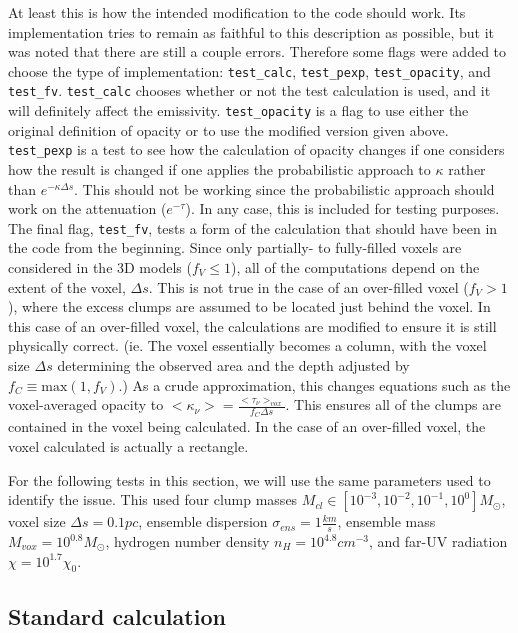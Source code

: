 \documentclass[a4paper]{article}
\begin{document}
    At least this is how the intended modification to the code should work.
    Its implementation tries to remain as faithful to this description as possible, but it was noted that there are still a couple errors.
    Therefore some flags were added to choose the type of implementation: \texttt{test\_calc}, \texttt{test\_pexp}, \texttt{test\_opacity}, and \texttt{test\_fv}.
    \texttt{test\_calc} chooses whether or not the test calculation is used, and it will definitely affect the emissivity.
    \texttt{test\_opacity} is a flag to use either the original definition of opacity or to use the modified version given above.
    \texttt{test\_pexp} is a test to see how the calculation of opacity changes if one considers how the result is changed if one applies the probabilistic approach to \(\kappa\) rather than \(e^{-\kappa \Delta s}\).
    This should not be working since the probabilistic approach should work on the attenuation (\(e^{-\tau}\)).
    In any case, this is included for testing purposes.
    The final flag, \texttt{test\_fv}, tests a form of the calculation that should have been in the code from the beginning.
    Since only partially- to fully-filled voxels are considered in the 3D models (\(f_V \leq 1\)), all of the computations depend on the extent of the voxel, \(\Delta s\).
    This is not true in the case of an over-filled voxel (\(f_V > 1\)), where the excess clumps are assumed to be located just behind the voxel.
    In this case of an over-filled voxel, the calculations are modified to ensure it is still physically correct.
    (ie. The voxel essentially becomes a column, with the voxel size \(\Delta s\) determining the observed area and the depth adjusted by \(f_C \equiv \mathrm{max}(1, f_V)\).)
    As a crude approximation, this changes equations such as the voxel-averaged opacity to \(<\kappa_\nu> = \frac{<\tau_\nu>_{vox}}{f_C \Delta s}\).
    This ensures all of the clumps are contained in the voxel being calculated.
    In the case of an over-filled voxel, the voxel calculated is actually a rectangle.

    For the following tests in this section, we will use the same parameters used to identify the issue.
    This used four clump masses \(M_{cl} \in [10^{-3}, 10^{-2}, 10^{-1}, 10^{0}] M_\odot\),
    voxel size \(\Delta s = 0.1 pc\),
    ensemble dispersion \(\sigma_{ens} = 1 \frac{km}{s}\),
    ensemble mass \(M_{vox} = 10^{0.8} M_\odot\),
    hydrogen number density \(n_H = 10^{4.8} cm^{-3}\),
    and far-UV radiation \(\chi = 10^{1.7} \chi_0\).

    \subsection{Standard calculation}
\end{document}

